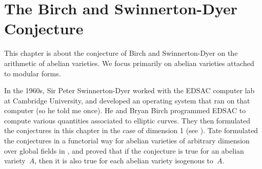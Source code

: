 \documentclass{report}
\begin{document}


\chapter{The Birch and Swinnerton-Dyer Conjecture}

This chapter is about the conjecture of Birch and Swinnerton-Dyer on
the arithmetic of abelian varieties.  We focus primarily on abelian
varieties attached to modular forms.

In the 1960s, Sir Peter Swinnerton-Dyer worked with the EDSAC computer
lab at Cambridge University, and developed an operating system that
ran on that computer (so he told me once).  He and Bryan Birch
programmed EDSAC to compute various quantities associated to elliptic
curves.  They then formulated the conjectures in this chapter in the
case of dimension 1 (see \cite{birch:EDSAC, birch:bsd, sd:bsd}).  Tate
formulated the conjectures in a functorial way for abelian varieties
of arbitrary dimension over global fields in \cite{tate:bsd}, and proved
that if the conjecture is true for an abelian variety~$A$, then it is
also true for each abelian variety isogenous to~$A$.
\end{document}
